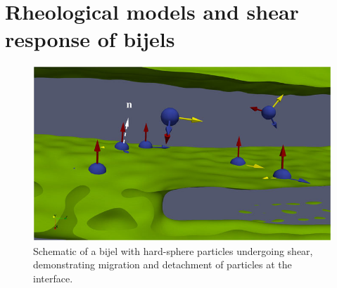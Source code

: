 
\section{Rheological models and shear response of bijels}

\begin{figure}
    \centering
    \includegraphics[scale = 2]{figures/literature_review/bijel_under_shear.jpeg}
    \caption{Schematic of a bijel with hard-sphere particles undergoing shear, demonstrating migration and detachment of particles at the interface. \cite{bonaccorso_shear_2020}}
    \label{fig:bijel_under_shear}
\end{figure}

